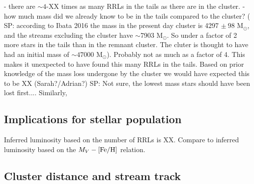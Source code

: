 \documentclass[twocolumn]{aastex63}
\newcommand{\sa}[1]{{\color{teal} SP: #1}}
\begin{document}


- there are $\sim4$-XX times as many RRLs in the tails as there are in the cluster.  
- how much mass did we already know to be in the tails compared to the cluster? (\sa{according to Ibata 2016 the mass in the present day cluster is 4297 $\pm~ 98$ M$_{\odot}$, and the streams excluding the cluster have $\sim$7903 M$_{\odot}$. So under a factor of 2 more stars in the tails than in the remnant cluster}. The cluter is thought to have had an initial mass of $\sim47000$ M$_{\odot}$). Probably not as much as a factor of 4. This makes it unexpected to have found this many RRLs in the tails. Based on prior knowledge of the mass loss undergone by the cluster we would have expected this to be XX (Sarah?/Adrian?) \sa{Not sure, the lowest mass stars should have been lost first...}. Similarly, 




\subsection{Implications for stellar population}


 Inferred luminosity based on the number of RRLs is XX. Compare to inferred luminosity based on the $M_V-[\mathrm{Fe}/\mathrm{H}]$ relation. 

\subsection{Cluster distance and stream track}





\end{document}
